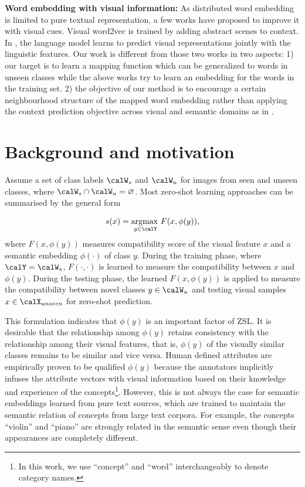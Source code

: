 \documentclass{bmvc2k}
\begin{document}
{\bf Word embedding with visual information:} As distributed word embedding is limited to pure textual representation, a few works have proposed to improve it with visual cues. Visual word2vec \cite{Kottur_2016_CVPR} is trained by adding abstract scenes to context.  In \cite{Lazaridou_combine_vs2015}, the language model learns to predict visual representations jointly with the linguistic features. Our work is different from those two works in two aspects: 1) our target is to learn a mapping function which can be generalized to words in unseen classes while the above works try to learn an embedding for the words in the training set. 2) the objective of our method is to encourage a certain neighbourhood structure of the mapped word embedding rather than applying the context prediction objective across visual and semantic domains as in \cite{Kottur_2016_CVPR,Lazaridou_combine_vs2015}.


\section{Background and motivation}
\label{sec: bg}

%
%
Assume a set of class labels $\calW_s$ and $\calW_u$ for images from seen and unseen classes, where $\calW_s \cap \calW_u = \varnothing$. Most zero-shot learning approaches can be summarised by the general form

\begin{align}\label{eq:formulation}
 s(x) = \argmax_{y \in \calY} {F(x, \phi(y))},
\end{align}
where $F(x, \phi(y))$ measures compatibility score of the visual feature $x$ and a semantic embedding $\phi(\cdot)$ of class $y$. During the training phase, where $\calY = \calW_s$, $F(\cdot, \cdot)$ is learned to measure the compatibility between $x$ and $\phi(y)$. During the testing phase, the learned $F(x, \phi(y))$ is applied to measure the compatibility between novel classes $y \in \calW_u$ and testing visual samples  $x \in \calX_{unseen}$ for zero-shot prediction.

This formulation indicates that $\phi(y)$ is an important factor of ZSL. It is desirable that the relationship among $\phi(y)$ retains consistency with the relationship among their visual features, that is, $\phi(y)$ of the visually similar classes remains to be similar and vice versa. Human defined attributes are empirically proven to be qualified $\phi(y)$ because the annotators implicitly infuses the attribute vectors with visual information based on their knowledge and experience of the concepts\footnote{In this work, we use ``concept'' and ``word'' interchangeably to denote category names.}. However, this is not always the case for semantic embeddings learned from pure text sources, which are trained to maintain the semantic relation of concepts from large text corpora.  For example, the concepts ``violin'' and ``piano'' are strongly related in the semantic sense even though their appearances are completely different.
\end{document}
